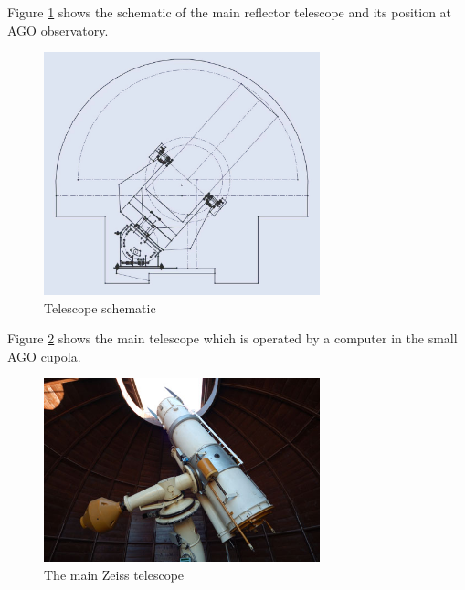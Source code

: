 	Figure \ref{fig:fmpiago1} shows the schematic of the main reflector telescope and its position at AGO observatory.
	
\begin{figure}[H]
  \centering
  \includegraphics[width=8cm]{images/FMPIAGO1}
  \caption{Telescope schematic}
  \label{fig:fmpiago1}
\end{figure}

	Figure \ref{fig:fmpiago2} shows the main telescope which is operated by a computer in the small AGO cupola.

\begin{figure}[H]
\centering
  \includegraphics[width=8cm]{images/FMPIAGO2}
  \caption{The main Zeiss telescope}
  \label{fig:fmpiago2}
\end{figure}